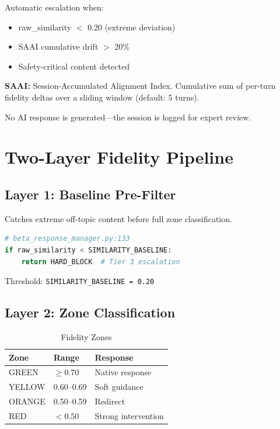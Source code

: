 \documentclass[11pt,twocolumn]{article}
\begin{document}
Automatic escalation when:
\begin{itemize}
    \item raw\_similarity $<$ 0.20 (extreme deviation)
    \item SAAI cumulative drift $>$ 20\%
    \item Safety-critical content detected
\end{itemize}

\textbf{SAAI:} Session-Accumulated Alignment Index. Cumulative sum of per-turn fidelity deltas over a sliding window (default: 5 turns).

No AI response is generated---the session is logged for expert review.

\section{Two-Layer Fidelity Pipeline}

\subsection{Layer 1: Baseline Pre-Filter}

Catches extreme off-topic content before full zone classification.

\begin{lstlisting}[language=Python]
# beta_response_manager.py:133
if raw_similarity < SIMILARITY_BASELINE:
    return HARD_BLOCK  # Tier 3 escalation
\end{lstlisting}

Threshold: \texttt{SIMILARITY\_BASELINE = 0.20}

\subsection{Layer 2: Zone Classification}

\begin{table}[h]
\centering
\small
\caption{Fidelity Zones}
\begin{tabular}{@{}lll@{}}
\toprule
\textbf{Zone} & \textbf{Range} & \textbf{Response} \\
\midrule
GREEN & $\geq 0.70$ & Native response \\
YELLOW & 0.60--0.69 & Soft guidance \\
ORANGE & 0.50--0.59 & Redirect \\
RED & $< 0.50$ & Strong intervention \\
\bottomrule
\end{tabular}
\end{table}
\end{document}
